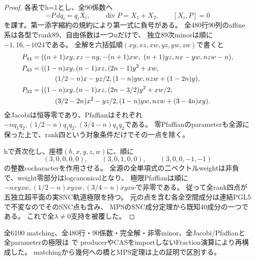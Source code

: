 \documentclass[a4paper,11pt]{ltjsarticle}
\theoremstyle{definition}
\begin{document}
\begin{proof}
各表でh=1とし、全90係数へ
\[
 -P\,dq_i=q_iX_i,\qquad\operatorname{div}P=X_1+X_2,
 \qquad[X_i,P]=0
\]
を課す。第一添字縮約の規約により第一式に負号がある。
全480行90列のaffine系は各型でrank89、自由係数は一つnだけで、
独立89次minorは順に$-1,16,-1024$である。
全解を六括弧順$(xy,xz,xw,yz,yw,zw)$で書くと
\[
\begin{aligned}
 P_{44}={}&((n+1)xy,xz-ny,-(n+1)xw,\ (n+1)yz,nx-yw,nzw-n),\\
 P_{43}={}&((1-n)xy,(n-1)xz,(2n-1)y^2+xw,\\
           &\hspace{7mm}(1/2-n)x-yz/2,(1-n)yw,nzw+(1-2n)y),\\
 P_{33}={}&((1-n)xy,(n-1)xz,(2n-3/2)y^2+xw/2,\\
           &\hspace{7mm}(3/2-2n)x^2-yz/2,(1-n)yw,nzw+(3-4n)xy).
\end{aligned}
\]
全Jacobiは恒等零であり、Pfaffianはそれぞれ
$-nq_1q_2,(1/2-n)q_1q_2,(3/4-n)q_1q_2$である。
零Pfaffianのparameterも全源に保った上で、rank四という対象条件だけでその一点を除く。

hで斉次化し、座標$(h,x,y,z,w)$に、順に
\[
 (3,0,0,0,0),\qquad(3,0,1,0,0),\qquad(3,0,0,-1,-1)
\]
の整数cocharacterを作用させる。
全源の全単項式の二ベクトルweightは非負で、weight零部分はlogcanonicalとなり、
極限Pfaffianは順に$-nxyzw,(1/2-n)xyzw,(3/4-n)xyzw$で非零である。
従って全rank四点が五独立超平面の実SNC軌道極限を持つ。
元の点を含む各全空間成分は連結PGL5で不変なのでそのSNC点も含み、
MPSのSNC成分定理から既知40成分の一つである。
これで全$\lambda\ne0$支持を被覆した。
\end{proof}
全6100 matching、全480行・90係数・完全解・非零minor、全Jacobi/Pfaffianと全parameterの極限は
で
producerやCASをimportしないFraction演算により再構成した。
matchingから幾何への橋とMPS定理は上の証明で区別する。
\end{document}
